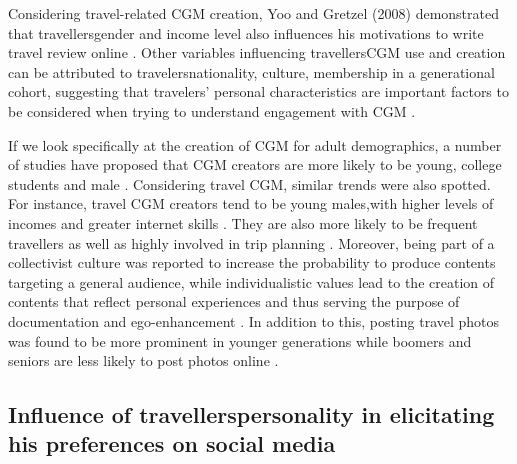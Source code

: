 Considering travel-related CGM creation, Yoo and Gretzel (2008) demonstrated that travellers\textquotesingle gender and income level also influences his motivations to write travel review online \cite{yoo2008motivates}. Other variables influencing travellers\textquotesingle CGM use and creation can be attributed to travelers\textquotesingle nationality, culture, membership in a generational cohort, suggesting that travelers’ personal characteristics are important factors to be considered when trying to understand engagement with CGM \cite{yoo2011influence}.



If we look specifically at the creation of CGM for adult demographics, a number of studies have proposed that CGM creators are more likely to be young, college students and male \cite{yoo2011influence}.
Considering travel CGM, similar trends were also spotted. For instance, travel CGM creators tend to be young males,with higher levels of incomes and greater internet skills \cite{yoo2008understanding}. They are also more likely to be frequent travellers as well as highly involved in trip planning \cite{gretzel2008use}. Moreover, being part of a collectivist culture was reported to increase the probability to produce contents targeting a general audience, while individualistic values lead to the creation of contents that reflect personal experiences and thus serving the purpose of documentation and ego-enhancement \cite{lee2009social}. In addition to this, posting travel photos was found to be more prominent in younger generations while boomers and seniors are less likely to post photos online \cite{yoo2011influence}.

    
\subsection{Influence of travellers\textquotesingle  personality in elicitating his preferences on social media}\label{3}



